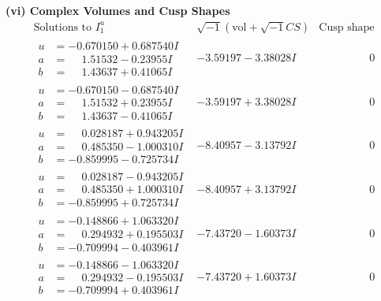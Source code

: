 \documentclass[1p]{elsarticle_modified}
\theoremstyle{definition}
\newcommand{\I}{\sqrt{-1}}
\begin{document}
\newpage\flushleft \textbf{(vi) Complex Volumes and Cusp Shapes}
$$\begin{array}{c|c|c}  
\text{Solutions to }I^u_{1}& \I (\text{vol} + \sqrt{-1}CS) & \text{Cusp shape}\\
 \hline 
\begin{aligned}
u &= -0.670150 + 0.687540 I \\
a &= \phantom{-}1.51532 - 0.23955 I \\
b &= \phantom{-}1.43637 + 0.41065 I\end{aligned}
 & -3.59197 - 3.38028 I & \phantom{-0.000000 } 0 \\ \hline\begin{aligned}
u &= -0.670150 - 0.687540 I \\
a &= \phantom{-}1.51532 + 0.23955 I \\
b &= \phantom{-}1.43637 - 0.41065 I\end{aligned}
 & -3.59197 + 3.38028 I & \phantom{-0.000000 } 0 \\ \hline\begin{aligned}
u &= \phantom{-}0.028187 + 0.943205 I \\
a &= \phantom{-}0.485350 - 1.000310 I \\
b &= -0.859995 - 0.725734 I\end{aligned}
 & -8.40957 - 3.13792 I & \phantom{-0.000000 } 0 \\ \hline\begin{aligned}
u &= \phantom{-}0.028187 - 0.943205 I \\
a &= \phantom{-}0.485350 + 1.000310 I \\
b &= -0.859995 + 0.725734 I\end{aligned}
 & -8.40957 + 3.13792 I & \phantom{-0.000000 } 0 \\ \hline\begin{aligned}
u &= -0.148866 + 1.063320 I \\
a &= \phantom{-}0.294932 + 0.195503 I \\
b &= -0.709994 - 0.403961 I\end{aligned}
 & -7.43720 - 1.60373 I & \phantom{-0.000000 } 0 \\ \hline\begin{aligned}
u &= -0.148866 - 1.063320 I \\
a &= \phantom{-}0.294932 - 0.195503 I \\
b &= -0.709994 + 0.403961 I\end{aligned}
 & -7.43720 + 1.60373 I & \phantom{-0.000000 } 0 \\ \hline\begin{aligned}

\end{aligned}
\end{array}$$
\end{document}
